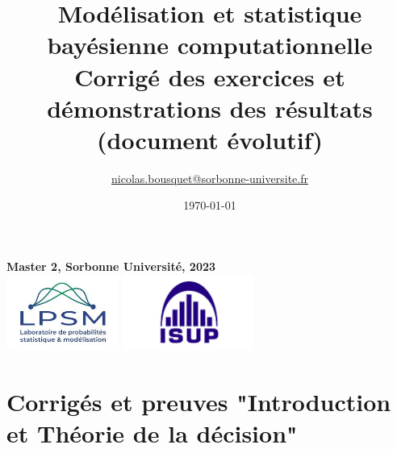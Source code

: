 \documentclass[10pt]{article}
\title{{\bf Modélisation et statistique bayésienne computationnelle} \\ \vspace{1cm} Corrigé des exercices et démonstrations des résultats \\ (document évolutif)}
\date{\today}
\author{\url{nicolas.bousquet@sorbonne-universite.fr}}
\begin{document}
\maketitle
\vspace{0.5cm} 
\begin{center}
\vspace{2cm} 
  {\large {\bf Master 2,  Sorbonne Universit\'e, 2023}} \\
  \vspace{1cm}
  \includegraphics[height=25mm]{logos/lpsm.jpg}
  \includegraphics[height=25mm]{logos/isup.jpg}
  \end{center}
 
\tableofcontents


%
% 
%
\def\mycmdexo{0}  %
\def\mycmdexotwo{0} %
\def\mycmdexothree{0} %
\def\mycmdproof{0} %
\def\mycmdprooftwo{0} %
\def\mycmdproofthree{0} %
\def\mycmdtpone{0} %
\def\mycmdtpthree{0} %
\def\mycmdannales{0} %

\clearpage


\section{Corrigés et preuves "Introduction et Théorie de la décision"}
\end{document}
